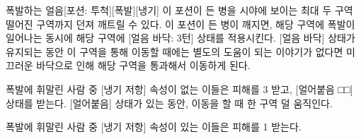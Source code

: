 \documentclass{report}
\begin{document}
	\begin{story}{폭발하는 얼음}{[포션: 투척][폭발][냉기]}
		이 포션이 든 병을 시야에 보이는 최대 두 구역 떨어진 구역까지 던져 깨트릴 수 있다. 이 포션이 든 병이 깨지면, 해당 구역에 폭발이 일어나는 동시에 해당 구역에 [얼음 바닥: 3턴] 상태를 적용시킨다. [얼음 바닥] 상태가 유지되는 동안 이 구역을 통해 이동할 때에는 별도의 도움이 되는 이야기가 없다면 미끄러운 바닥으로 인해 해당 구역을 통과해서 이동하게 된다.
		
		\smallskip
		
		폭발에 휘말린 사람 중 [냉기 저항] 속성이 없는 이들은 피해를 3 받고, [얼어붙음 □□] 상태를 받는다. [얼어붙음] 상태가 있는 동안, 이동을 할 때 한 구역 덜 움직인다.
		
		\smallskip
		
		폭발에 휘말린 사람 중 [냉기 저항] 속성이 있는 이들은 피해를 1 받는다.
		
	\end{story}
\end{document}
